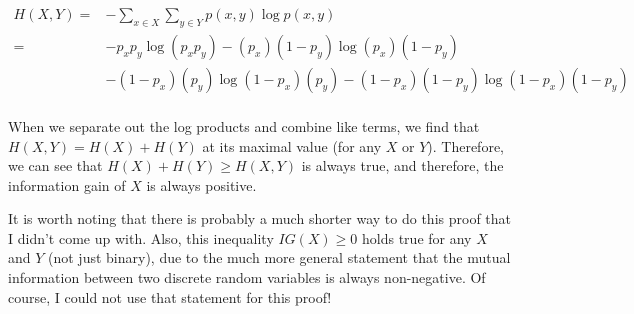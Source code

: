 \documentclass[fleqn]{homework}
\begin{document}
\begin{problem}{3}
    \begin{align*}
      H(X,Y) =& - \sum_{x \in X} \sum_{y \in Y} p(x,y) \log p(x,y) \\
             =& -p_x p_y \log (p_x p_y) - (p_x)(1-p_y) \log (p_x)(1-p_y) \\
              &- (1-p_x)(p_y) \log (1-p_x)(p_y) - (1-p_x)(1-p_y) \log (1-p_x)(1-p_y) \\
    \end{align*}

    When we separate out the log products and combine like terms, we find that
    $H(X,Y) = H(X) + H(Y)$ at its maximal value (for any $X$ or $Y$).
    Therefore, we can see that $H(X) + H(Y) \ge H(X,Y)$ is always true, and
    therefore, the information gain of $X$ is always positive.

    It is worth noting that there is probably a much shorter way to do this
    proof that I didn't come up with.  Also, this inequality $IG(X) \ge 0$ holds
    true for any $X$ and $Y$ (not just binary), due to the much more general
    statement that the mutual information between two discrete random variables
    is always non-negative.  Of course, I could not use that statement for this
    proof!
  \end{problem}
\end{document}
